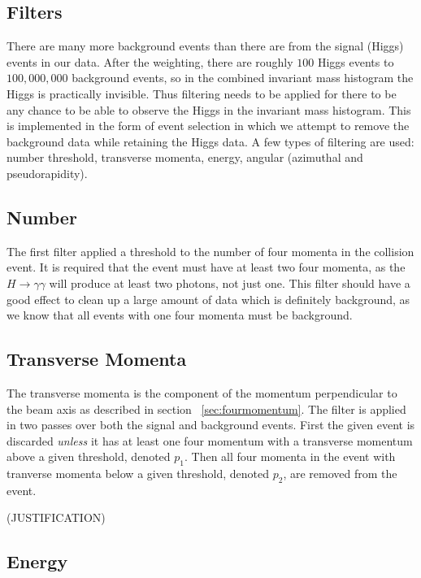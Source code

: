\documentclass[11pt]{amsart}
\begin{document}
\begin{multicols}{2}
\section{Filters}
\label{sec:filters}

There are many more background events than there are from the signal (Higgs) events in our data. After the weighting, there are roughly $100$ Higgs events to $100,000,000$ background events, so in the combined invariant mass histogram the Higgs is practically invisible. Thus filtering needs to be applied for there to be any chance to be able to observe the Higgs in the invariant mass histogram. This is implemented in the form of event selection in which we attempt to remove the background data while retaining the Higgs data. A few types of filtering are used: number threshold, transverse momenta, energy, angular (azimuthal and pseudorapidity).

\subsection{Number}

The first filter applied a threshold to the number of four momenta in the collision event. It is required that the event must have at least two four momenta, as the $H \to \gamma\gamma$ will produce at least two photons, not just one. This filter should have a good effect to clean up a large amount of data which is definitely background, as we know that all events with one four momenta must be background.

\subsection{Transverse Momenta}

The transverse momenta is the component of the momentum perpendicular to the beam axis as described in section ~\ref{sec:fourmomentum}. The filter is applied in two passes over both the signal and background events. First the given event is discarded \textit{unless} it has at least one four momentum with a transverse momentum above a given threshold, denoted $p_1$. Then all four momenta in the event with tranverse momenta below a given threshold, denoted $p_2$, are removed from the event.

(JUSTIFICATION)

\subsection{Energy}


\end{multicols}
\end{document}

